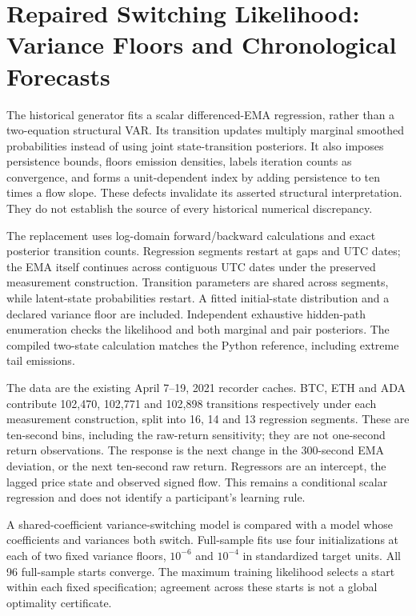 
\section{Repaired Switching Likelihood: Variance Floors and Chronological Forecasts}
\label{sec:regime_repaired}
The historical generator fits a scalar differenced-EMA regression, rather than a two-equation structural VAR. Its transition updates multiply marginal smoothed probabilities instead of using joint state-transition posteriors. It also imposes persistence bounds, floors emission densities, labels iteration counts as convergence, and forms a unit-dependent index by adding persistence to ten times a flow slope. These defects invalidate its asserted structural interpretation. They do not establish the source of every historical numerical discrepancy.

The replacement uses log-domain forward/backward calculations and exact posterior transition counts. Regression segments restart at gaps and UTC dates; the EMA itself continues across contiguous UTC dates under the preserved measurement construction. Transition parameters are shared across segments, while latent-state probabilities restart. A fitted initial-state distribution and a declared variance floor are included. Independent exhaustive hidden-path enumeration checks the likelihood and both marginal and pair posteriors. The compiled two-state calculation matches the Python reference, including extreme tail emissions.

The data are the existing April 7--19, 2021 recorder caches. BTC, ETH and ADA contribute 102,470, 102,771 and 102,898 transitions respectively under each measurement construction, split into 16, 14 and 13 regression segments. These are ten-second bins, including the raw-return sensitivity; they are not one-second return observations. The response is the next change in the 300-second EMA deviation, or the next ten-second raw return. Regressors are an intercept, the lagged price state and observed signed flow. This remains a conditional scalar regression and does not identify a participant's learning rule.

A shared-coefficient variance-switching model is compared with a model whose coefficients and variances both switch. Full-sample fits use four initializations at each of two fixed variance floors, $10^{-6}$ and $10^{-4}$ in standardized target units. All 96 full-sample starts converge. The maximum training likelihood selects a start within each fixed specification; agreement across these starts is not a global optimality certificate.

